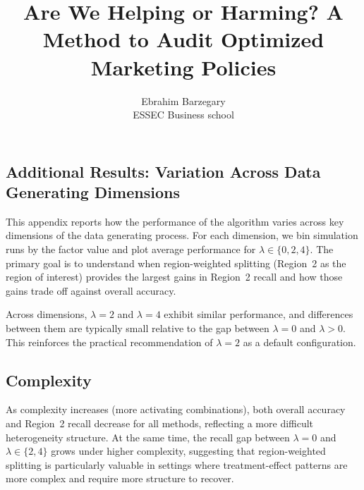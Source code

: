 \documentclass[11pt,letterpaper,english]{article}
\theoremstyle{definition}
\theoremstyle{definition}
\begin{document}
\begin{bibunit}

\newpage

\setcounter{table}{0}
\setcounter{page}{1}
\setcounter{figure}{0}
\setcounter{equation}{0}
\setcounter{footnote}{0}
\renewcommand{\thetable}{A\arabic{table}}
\renewcommand{\thefigure}{A\arabic{figure}}
\renewcommand{\theequation}{A.\arabic{equation}}
\renewcommand{\thepage}{\roman{page}}
\title{Are We Helping or Harming? A Method to Audit Optimized Marketing Policies}


\author{
       Ebrahim Barzegary  \\
        ESSEC Business school\\
 }

\maketitle
\begin{appendices}

\section{Additional Results: Variation Across Data Generating Dimensions}
\label{app:lambda-dimensions}

This appendix reports how the performance of the algorithm varies across key dimensions of the data generating process. For each dimension, we bin simulation runs by the factor value and plot average performance for $\lambda\in\{0,2,4\}$. The primary goal is to understand when region-weighted splitting (Region~2 as the region of interest) provides the largest gains in Region~2 recall and how those gains trade off against overall accuracy.

Across dimensions, $\lambda=2$ and $\lambda=4$ exhibit similar performance, and differences between them are typically small relative to the gap between $\lambda=0$ and $\lambda>0$. This reinforces the practical recommendation of $\lambda=2$ as a default configuration.

\subsection{Complexity}
As complexity increases (more activating combinations), both overall accuracy and Region~2 recall decrease for all methods, reflecting a more difficult heterogeneity structure. At the same time, the recall gap between $\lambda=0$ and $\lambda\in\{2,4\}$ grows under higher complexity, suggesting that region-weighted splitting is particularly valuable in settings where treatment-effect patterns are more complex and require more structure to recover.


\end{appendices}
\end{bibunit}
\end{document}
